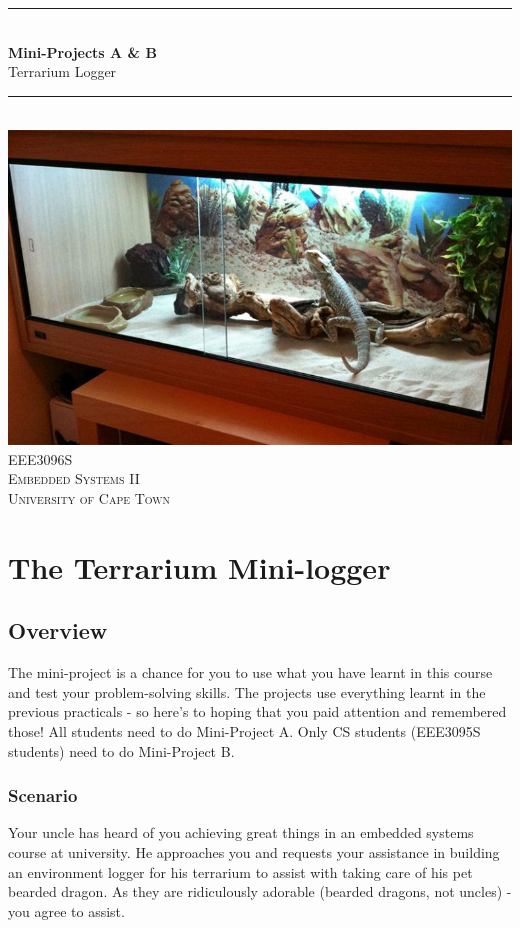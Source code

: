 \newpage
\begin{center}
    \rule{\linewidth}{0.2 mm} \\[0.4 cm]
	{ \huge \bfseries Mini-Projects A \& B}\\
	\huge Terrarium Logger
	\rule{\linewidth}{0.2 mm} \\[1.5 cm]
	\includegraphics[scale = 0.5]{Figures/terrarium.jpg}\\[1 cm]
	\textsc{\Large EEE3096S}\\[0.5 cm]
	\textsc{\large Embedded Systems II}\\[0.5 cm]
	\textsc{\LARGE University of Cape Town}\\[0.5 cm]
\end{center}
\newpage
\chapter{The Terrarium Mini-logger}
\section{Overview}
The mini-project is a chance for you to use what you have learnt in this course and test your problem-solving skills. The projects use everything learnt in the previous practicals - so here's to hoping that you paid attention and remembered those! All students need to do Mini-Project A. Only CS students (EEE3095S students) need to do Mini-Project B.

\subsection{Scenario}
Your uncle has heard of you achieving great things in an embedded systems course at university. He approaches you and requests your assistance in building an environment logger for his terrarium to assist with taking care of his pet bearded dragon. As they are ridiculously adorable (bearded dragons, not uncles) - you agree to assist.

